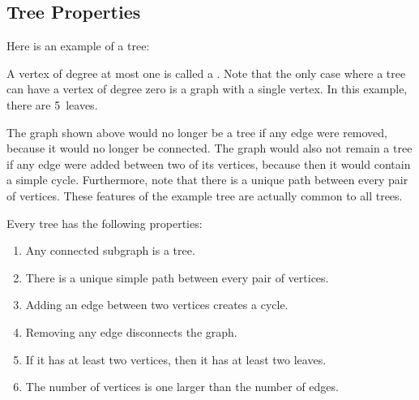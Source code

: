 \subsection{Tree Properties}

Here is an example of a tree:


A vertex of degree at most one is called a .  Note that the only
case where a tree can have a vertex of degree zero is a graph with a single
vertex.  In this example, there are 5~leaves.

The graph shown above would no longer be a tree if any edge were removed,
because it would no longer be connected.  The graph would also not remain
a tree if any edge were added between two of its vertices, because then it
would contain a simple cycle.  Furthermore, note that there is a unique
path between every pair of vertices.  These features of the example tree
are actually common to all trees.

\begin{theorem}\label{th:treeprops}
Every tree has the following properties:

\begin{enumerate}
\item Any connected subgraph is a tree.
\item There is a unique simple path between every pair of vertices.
\item Adding an edge between two vertices creates a cycle.
\item Removing any edge disconnects the graph.
\item If it has at least two vertices, then it has at least two leaves.
\item The number of vertices is one larger than the number of edges.
\end{enumerate}
\end{theorem}

